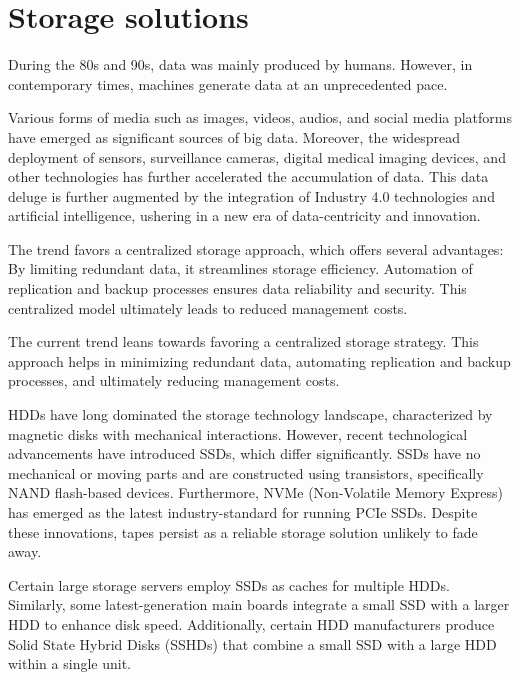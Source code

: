 \section{Storage solutions}

During the 80s and 90s, data was mainly produced by humans.
However, in contemporary times, machines generate data at an unprecedented pace.

Various forms of media such as images, videos, audios, and social media platforms have emerged as significant sources of big data.
Moreover, the widespread deployment of sensors, surveillance cameras, digital medical imaging devices, and other technologies has further accelerated the accumulation of data.
This data deluge is further augmented by the integration of Industry 4.0 technologies and artificial intelligence, ushering in a new era of data-centricity and innovation.

The trend favors a centralized storage approach, which offers several advantages:
By limiting redundant data, it streamlines storage efficiency.
Automation of replication and backup processes ensures data reliability and security.
This centralized model ultimately leads to reduced management costs.

The current trend leans towards favoring a centralized storage strategy. 
This approach helps in minimizing redundant data, automating replication and backup processes, and ultimately reducing management costs.

HDDs have long dominated the storage technology landscape, characterized by magnetic disks with mechanical interactions.
However, recent technological advancements have introduced SSDs, which differ significantly. 
SSDs have no mechanical or moving parts and are constructed using transistors, specifically NAND flash-based devices.
Furthermore, NVMe (Non-Volatile Memory Express) has emerged as the latest industry-standard for running PCIe SSDs. 
Despite these innovations, tapes persist as a reliable storage solution unlikely to fade away.

Certain large storage servers employ SSDs as caches for multiple HDDs. 
Similarly, some latest-generation main boards integrate a small SSD with a larger HDD to enhance disk speed. 
Additionally, certain HDD manufacturers produce Solid State Hybrid Disks (SSHDs) that combine a small SSD with a large HDD within a single unit.

